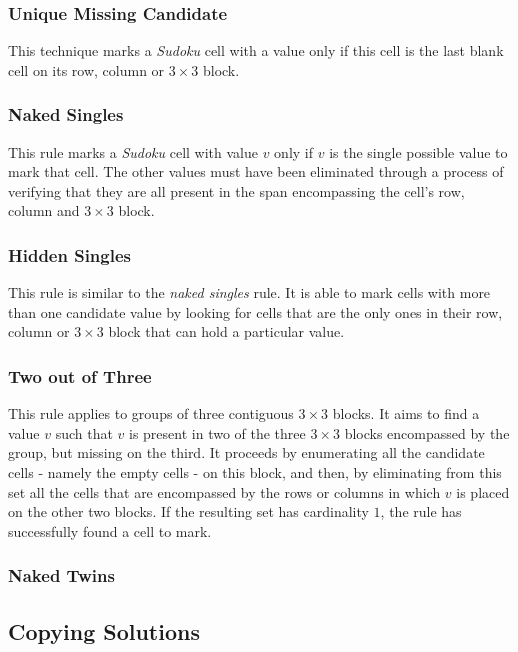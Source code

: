 \documentclass[letterpaper]{article}
\begin{document}
\subsubsection{Unique Missing Candidate}

This technique marks a {\em Sudoku} cell with a value only if this cell is the last blank cell on its row, column or $3 \times 3$ block.

\subsubsection{Naked Singles}

This rule marks a {\em Sudoku} cell with value $v$ only if $v$ is the single possible value to mark that cell. The other values must have been eliminated through a process of verifying that they are all present in the span encompassing the cell's row, column and $3 \times 3$ block.

\subsubsection{Hidden Singles}

This rule is similar to the {\em naked singles} rule. It is able to mark cells with more than one candidate value by looking for cells that are the only ones in their row, column or $3 \times 3$ block that can hold a particular value.

\subsubsection{Two out of Three}

This rule applies to groups of three contiguous $3 \times 3$ blocks. It aims to find a value $v$ such that $v$ is present in two of the three $3 \times 3$ blocks encompassed by the group, but missing on the third. It proceeds by enumerating all the candidate cells - namely the empty cells - on this block, and then, by eliminating from this set all the cells that are encompassed by the rows or columns in which $v$ is placed on the other two blocks. If the resulting set has cardinality $1$, the rule has successfully found a cell to mark.

\subsubsection{Naked Twins}

\subsection{Copying Solutions}
\end{document}
